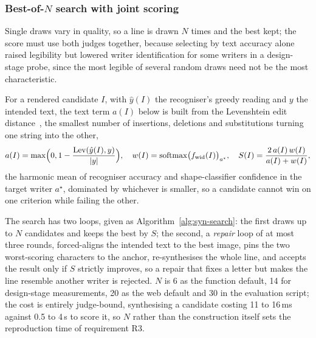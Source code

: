 \subsubsection{Best-of-$N$ search with joint scoring}
\label{sec:syn-search}

Single draws vary in quality, so a line is drawn $N$ times and the best kept; the score must use both judges together, because selecting by text accuracy alone raised legibility but lowered writer identification for some writers in a design-stage probe, since the most legible of several random draws need not be the most characteristic.

For a rendered candidate $I$, with $\hat y(I)$ the recogniser's greedy reading and $y$ the intended text, the text term $a(I)$ below is built from the Levenshtein edit distance~\cite[pp.~707--708]{levenshtein1966}, the smallest number of insertions, deletions and substitutions turning one string into the other,
\begin{equation}
a(I)=\max\Bigl(0,1-\frac{\mathrm{Lev}(\hat y(I),y)}{|y|}\Bigr),\quad w(I)=\mathrm{softmax}\bigl(f_{\mathrm{wid}}(I)\bigr)_{a^\star},\quad S(I)=\frac{2\,a(I)\,w(I)}{a(I)+w(I)},
\label{eq:syn-score}
\end{equation}
the harmonic mean of recogniser accuracy and shape-classifier confidence in the target writer $a^\star$, dominated by whichever is smaller, so a candidate cannot win on one criterion while failing the other.

The search has two loops, given as Algorithm~\ref{alg:syn-search}: the first draws up to $N$ candidates and keeps the best by $S$; the second, a \emph{repair} loop of at most three rounds, forced-aligns the intended text to the best image, pins the two worst-scoring characters to the anchor, re-synthesises the whole line, and accepts the result only if $S$ strictly improves, so a repair that fixes a letter but makes the line resemble another writer is rejected. $N$ is 6 as the function default, 14 for design-stage measurements, 20 as the web default and 30 in the evaluation script; the cost is entirely judge-bound, synthesising a candidate costing 11 to 16\,ms against 0.5 to 4\,s to score it, so $N$ rather than the construction itself sets the reproduction time of requirement R3.

